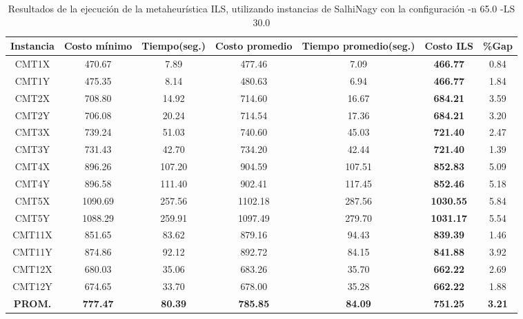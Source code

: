 \begin{table}[ht]
\caption{Resultados de la ejecución de la metaheurística ILS, utilizando instancias de SalhiNagy con la configuración -n 65.0 -LS 30.0}
\centering
\small
\begin{tabular}{c c c c c c c}
\hline\hline
Instancia & Costo mínimo & Tiempo(seg.) & Costo promedio & Tiempo promedio(seg.) & Costo ILS & \%Gap \\ [0.5ex]
\hline
CMT1X & 470.67 & 7.89 & 
477.46 & 7.09 & \bf{466.77} & 
0.84\\CMT1Y & 475.35 & 8.14 & 
480.63 & 6.94 & \bf{466.77} & 
1.84\\CMT2X & 708.80 & 14.92 & 
714.60 & 16.67 & \bf{684.21} & 
3.59\\CMT2Y & 706.08 & 20.24 & 
714.54 & 17.36 & \bf{684.21} & 
3.20\\CMT3X & 739.24 & 51.03 & 
740.60 & 45.03 & \bf{721.40} & 
2.47\\CMT3Y & 731.43 & 42.70 & 
734.20 & 42.44 & \bf{721.40} & 
1.39\\CMT4X & 896.26 & 107.20 & 
904.59 & 107.51 & \bf{852.83} & 
5.09\\CMT4Y & 896.58 & 111.40 & 
902.41 & 117.45 & \bf{852.46} & 
5.18\\CMT5X & 1090.69 & 257.56 & 
1102.18 & 287.56 & \bf{1030.55} & 
5.84\\CMT5Y & 1088.29 & 259.91 & 
1097.49 & 279.70 & \bf{1031.17} & 
5.54\\CMT11X & 851.65 & 83.62 & 
879.16 & 94.43 & \bf{839.39} & 
1.46\\CMT11Y & 874.86 & 92.12 & 
892.72 & 84.15 & \bf{841.88} & 
3.92\\CMT12X & 680.03 & 35.06 & 
683.26 & 35.70 & \bf{662.22} & 
2.69\\CMT12Y & 674.65 & 33.70 & 
678.00 & 35.28 & \bf{662.22} & 
1.88\\\bf{PROM.} & 
\bf{777.47} & \bf{80.39} & \bf{785.85} & \bf{84.09} & \bf{751.25} & \bf{3.21}\\[1ex]\hline
\end{tabular}
\label{table:nonlin}
\end{table} \clearpage
